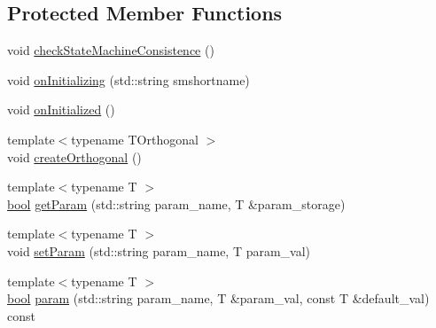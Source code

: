 \subsection*{Protected Member Functions}
\begin{DoxyCompactItemize}
\item 
void \hyperlink{classsmacc_1_1ISmaccStateMachine_af34fa8346ae3f52882704422d59b9055}{check\+State\+Machine\+Consistence} ()
\item 
void \hyperlink{classsmacc_1_1ISmaccStateMachine_ae8c9c79ca6cd77c975f5d9cda33a6d5e}{on\+Initializing} (std\+::string smshortname)
\item 
void \hyperlink{classsmacc_1_1ISmaccStateMachine_a95e7f71d0d88fffd0afebb1f9ccdade5}{on\+Initialized} ()
\item 
{\footnotesize template$<$typename T\+Orthogonal $>$ }\\void \hyperlink{classsmacc_1_1ISmaccStateMachine_a9155cf3d1877255d70b0bd71648734a3}{create\+Orthogonal} ()
\item 
{\footnotesize template$<$typename T $>$ }\\\hyperlink{classbool}{bool} \hyperlink{classsmacc_1_1ISmaccStateMachine_ac9fda4abe36f62db5ae231289afa4665}{get\+Param} (std\+::string param\+\_\+name, T \&param\+\_\+storage)
\item 
{\footnotesize template$<$typename T $>$ }\\void \hyperlink{classsmacc_1_1ISmaccStateMachine_afc730437f45fa107292c078dfab2aa37}{set\+Param} (std\+::string param\+\_\+name, T param\+\_\+val)
\item 
{\footnotesize template$<$typename T $>$ }\\\hyperlink{classbool}{bool} \hyperlink{classsmacc_1_1ISmaccStateMachine_a2900ef881968af90562abfc9103570f3}{param} (std\+::string param\+\_\+name, T \&param\+\_\+val, const T \&default\+\_\+val) const
\end{DoxyCompactItemize}
